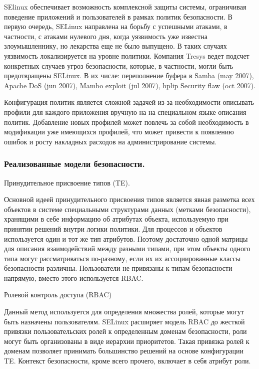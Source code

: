 SElinux обеспечивает возможность 
комплексной защиты системы, ограничивая поведение 
приложений и пользователей в рамках политик 
безопасности. В первую очередь, SELinux 
направлена на борьбу с успешными атаками, 
в частности, с атаками нулевого дня, когда 
уязвимость уже известна злоумышленнику, 
но лекарства еще не было выпущено. В таких 
случаях уязвимость локализируется на уровне 
политики. Компания Tresys ведет подсчет 
конкретных случаев угроз безопасности, которые, 
в частности, могли быть предотвращены SELinux. 
В их числе: переполнение буфера в Samba (may 
2007), Apache DoS (jun 2007), Mambo exploit (jul 
2007), hplip Security flaw (oct 2007). 

Конфигурация политик является 
сложной задачей из-за необходимости
описывать профили для каждого приложения 
вручную на на специальном языке описания
политик. Добавление новых профилей может повлечь 
за собой необходимость в модификации уже имеющихся 
профилей, что может привести к появлению 
ошибок и росту накладных расходов на 
администрирование системы.  

\subsubsection {Реализованные модели безопасности. } 

Принудительное присвоение типов (TE). 

Основной идеей принудительного присвоения
типов является явная разметка всех объектов 
в системе специальными структурами данных 
(метками безопасности), хранящими в себе информацию
об атрибутах объекта, используемую при принятии 
решений внутри логики политики. 
Для процессов и объектов используется 
один и тот же тип атрибутов. Поэтому достаточно 
одной матрицы для описания взаимодействий между 
разными типами, при этом объекты одного типа могут 
рассматриваться по-разному, если их их ассоциированные 
классы безопасности различны. Пользователи не 
привязаны к типам безопасности напрямую, вместо 
этого используется RBAC.

\bigskip
Ролевой контроль доступа (RBAC) 

Данный метод используется для определения 
множества ролей, которые могут 
быть назначены пользователям. SELinux расширяет 
модель RBAC до жесткой привязки пользовательских 
ролей к определенным доменам безопасности, роли 
могут быть организованы в виде иерархии приоритетов. 
Такая привязка ролей к доменам позволяет принимать 
большинство решений на основе конфигурации TE. 
Контекст безопасности, кроме всего прочего, включает 
в себя атрибут роли.

